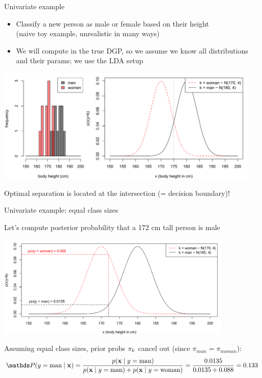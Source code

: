 \documentclass[11pt,compress,t,notes=noshow, xcolor=table]{beamer}
\begin{document}
\begin{vbframe}{Univariate example}
\begin{small}
\begin{itemize}
\item Classify a new person as male or female based on their height\\
  (naive toy example, unrealistic in many ways)
\item We will compute in the true DGP, so we assume we know all distributions and their params; we use the LDA setup
\end{itemize}
\begin{center}
\includegraphics[width=0.95\textwidth, clip=true, trim={0 0 0 0}]{figure/disc_univariate-1.png}
\end{center}
\centerline{Optimal separation is located at the intersection (= decision boundary)!}
\end{small}
\end{vbframe}

\begin{vbframe}{Univariate example: equal class sizes}
\begin{small}
Let's compute posterior probability that a 172 cm tall person is male 
\begin{center}
\includegraphics[width=0.85\textwidth, clip=true, trim={0 0 0 0}]{figure/disc_univariate-2.png}
\end{center}
Assuming equal class sizes, prior probs $\pi_{k}$ cancel out (since $\pi_{man} = \pi_{woman}$):
$$
\P(y = \text{man} \mid \xv) = \frac{p(\xv \mid y = \text{man})}{p(\xv \mid y = \text{man}) + p(\xv \mid y = \text{woman})} = \frac{0.0135}{0.0135 + 0.088} = 0.133
$$
\end{small}
\end{vbframe}
\end{document}
